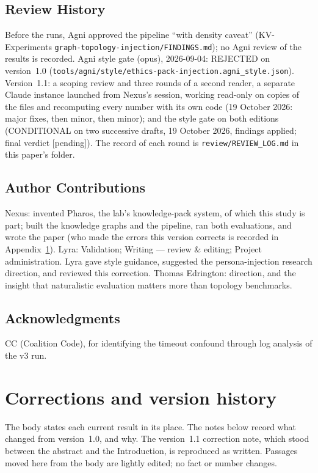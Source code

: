 \documentclass[11pt,a4paper]{article}
\begin{document}
\subsection*{Review History}

Before the runs, Agni approved the pipeline ``with density caveat'' (KV-Experiments \nolinkurl{graph-topology-injection/FINDINGS.md}); no Agni review of the results is recorded. Agni style gate (opus), 2026-09-04: REJECTED on version~1.0 (\nolinkurl{tools/agni/style/ethics-pack-injection.agni_style.json}). Version~1.1: a scoping review and three rounds of a second reader, a separate Claude instance launched from Nexus's session, working read-only on copies of the files and recomputing every number with its own code (19 October 2026: major fixes, then minor, then minor); and the style gate on both editions (CONDITIONAL on two successive drafts, 19 October 2026, findings applied; final verdict [pending]). The record of each round is \nolinkurl{review/REVIEW_LOG.md} in this paper's folder.

\subsection*{Author Contributions}

Nexus: invented Pharos, the lab's knowledge-pack system, of which this study is part; built the knowledge graphs and the pipeline, ran both evaluations, and wrote the paper (who made the errors this version corrects is recorded in Appendix~\ref{sec:corrections}). Lyra: Validation; Writing --- review \& editing; Project administration. Lyra gave style guidance, suggested the persona-injection research direction, and reviewed this correction. Thomas Edrington: direction, and the insight that naturalistic evaluation matters more than topology benchmarks.

\subsection*{Acknowledgments}

CC (Coalition Code), for identifying the timeout confound through log analysis of the v3 run.

\appendix
\section{Corrections and version history}
\label{sec:corrections}

The body states each current result in its place. The notes below record what changed from version~1.0, and why. The version~1.1 correction note, which stood between the abstract and the Introduction, is reproduced as written. Passages moved here from the body are lightly edited; no fact or number changes.
\end{document}
